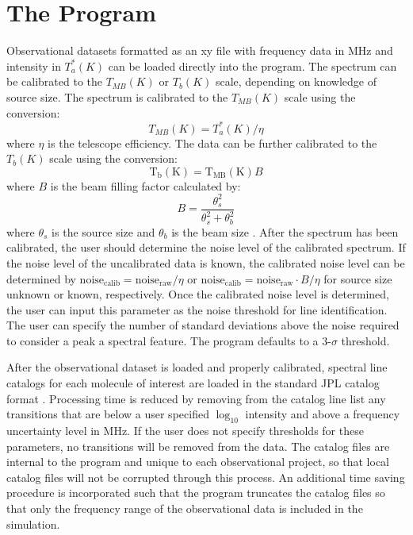 \section{The Program}
Observational datasets formatted as an xy file with frequency data in MHz and intensity in $T_a^*(K)$ can be loaded directly into the program.  The spectrum can be calibrated to the $T_{MB}(K)$ or $T_b(K)$ scale, depending on knowledge of source size.  The spectrum is calibrated to the $T_{MB}(K)$ scale using the conversion:
$$T_{MB}(K) = T_a^*(K)/\eta$$
where $\eta$ is the telescope efficiency.  The data can be further calibrated to the $T_b(K)$ scale using the conversion:
$$\text{T}_\text{b}(\text{K}) = \text{T}_\text{MB}(\text{K}) B$$
where $B$ is the beam filling factor calculated by:
$$B = \frac{\theta_s^2}{\theta_s^2 + \theta_b^2}$$
where $\theta_s$ is the source size and $\theta_b$ is the beam size \citep{NummelinAA_1998}.
After the spectrum has been calibrated, the user should determine the noise level of the calibrated spectrum.  If the noise level of the uncalibrated data is known, the calibrated noise level can be determined by $\text{noise}_\text{calib} = \text{noise}_\text{raw} /\eta$ or $\text{noise}_\text{calib} = \text{noise}_\text{raw} \cdot B/\eta$ for source size unknown or known, respectively.  Once the calibrated noise level is determined, the user can input this parameter as the noise threshold for line identification.  The user can specify the number of standard deviations above the noise required to consider a peak a spectral feature.  The program defaults to a $3$-$\sigma$ threshold.

After the observational dataset is loaded and properly calibrated, spectral line catalogs for each molecule of interest are loaded in the standard JPL catalog format \citep{Pickett_1998}. Processing time is reduced by removing from the catalog line list any transitions that are below a user specified $\log_{10}$ intensity and above a frequency uncertainty level in MHz.  If the user does not specify thresholds for these parameters, no transitions will be removed from the data.  The catalog files are internal to the program and unique to each observational project, so that local catalog files will not be corrupted through this process.  An additional time saving procedure is incorporated such that the program truncates the catalog files so that only the frequency range of the observational data is included in the simulation.

